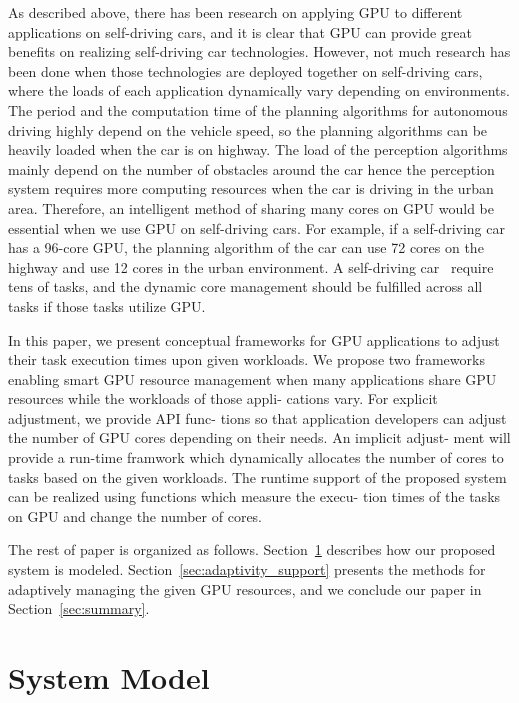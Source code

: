 \documentclass[times, 10pt, twocolumn]{article}
\begin{document}
As described above, there has been research on applying GPU to different applications on self-driving cars, and it is clear that GPU can provide great benefits on realizing self-driving car technologies. However, not much research has been done when those technologies are deployed together on self-driving cars, where the loads of each application dynamically vary depending on environments. The period and the computation time of the planning algorithms for autonomous driving highly depend on the vehicle speed, so the planning algorithms can be heavily loaded when the car is on highway. The load of the perception algorithms mainly depend on the number of obstacles around the car hence the perception system requires more computing resources when the car is driving in the urban area. Therefore, an intelligent method of sharing many cores on GPU would be essential when we use GPU on self-driving cars. For example, if a self-driving car has a 96-core GPU, the planning algorithm of the car can use 72 cores on the highway and use 12 cores in the urban environment. A self-driving car~\cite{Urmson08} require tens of tasks, and the dynamic core management should be fulfilled across all tasks if those tasks utilize GPU. 

In this paper, we present conceptual frameworks for
GPU applications to adjust their task execution times upon
given workloads. We propose two frameworks enabling
smart GPU resource management when many applications
share GPU resources while the workloads of those appli-
cations vary. For explicit adjustment, we provide API func-
tions so that application developers can adjust the number
of GPU cores depending on their needs. An implicit adjust-
ment will provide a run-time framwork which dynamically
allocates the number of cores to tasks based on the given
workloads. The runtime support of the proposed system
can be realized using functions which measure the execu-
tion times of the tasks on GPU and change the number of
cores.


The rest of paper is organized as follows. Section~\ref{sec:system_model} describes how our proposed system is modeled. Section~\ref{sec:adaptivity_support} presents the methods for adaptively managing the given GPU resources, and we conclude our paper in Section~\ref{sec:summary}.

\section{System Model}
\label{sec:system_model}
\end{document}
